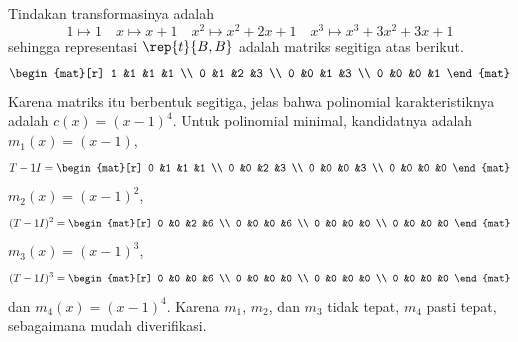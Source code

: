 \begin{exercises}
\begin{answer}
      Tindakan transformasinya adalah
      \begin{equation*}
        1\mapsto 1
        \quad
        x\mapsto x+1
        \quad
        x^2\mapsto x^2+2x+1
        \quad
        x^3\mapsto x^3+3x^2+3x+1
      \end{equation*}
      sehingga representasi $\rep{t}{B,B}$ adalah matriks segitiga atas berikut.
      \begin{equation*}
        \begin{mat}[r]
          1  &1  &1  &1  \\
          0  &1  &2  &3  \\
          0  &0  &1  &3  \\
          0  &0  &0  &1
        \end{mat}
      \end{equation*}
      Karena matriks itu berbentuk segitiga, jelas bahwa polinomial karakteristiknya
      adalah $c(x)=(x-1)^4$.
      Untuk polinomial minimal, kandidatnya adalah $m_1(x)=(x-1)$,
      \begin{equation*}
        T-1I=
        \begin{mat}[r]
          0  &1  &1  &1  \\
          0  &0  &2  &3  \\
          0  &0  &0  &3  \\
          0  &0  &0  &0
        \end{mat}
      \end{equation*}
      $m_2(x)=(x-1)^2$, 
      \begin{equation*}
        (T-1I)^2=
        \begin{mat}[r]
          0  &0  &2  &6  \\
          0  &0  &0  &6  \\
          0  &0  &0  &0  \\
          0  &0  &0  &0
        \end{mat}
      \end{equation*}
      $m_3(x)=(x-1)^3$,
      \begin{equation*}
        (T-1I)^3=
        \begin{mat}[r]
          0  &0  &0  &6  \\
          0  &0  &0  &0  \\
          0  &0  &0  &0  \\
          0  &0  &0  &0
        \end{mat}
      \end{equation*}
      dan $m_4(x)=(x-1)^4$.
      Karena $m_1$, $m_2$, dan $m_3$ tidak tepat, $m_4$ pasti tepat,
      sebagaimana mudah diverifikasi.
      

\end{answer}
\end{exercises}
